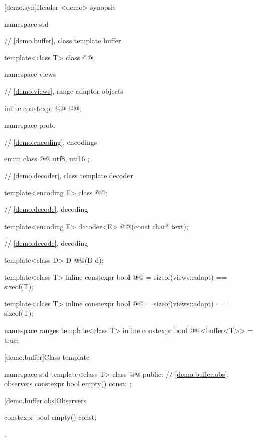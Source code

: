 [demo.syn]{Header <demo> synopsis}

\begin{codeblock}
namespace std {
  // \ref{demo.buffer}, class template buffer

  template<class T> class @@;

  namespace views {
    // \ref{demo.views}, range adaptor objects

    inline constexpr @@ @@;
  }

  namespace proto {
    // \ref{demo.encoding}, encodings

    enum class @@ { utf8, utf16 };

    // \ref{demo.decoder}, class template decoder

    template<encoding E> class @@;

    // \ref{demo.decode}, decoding

    template<encoding E> decoder<E> @@(const char* text);
  }

  // \ref{demo.decode}, decoding

  template<class D> D @@(D d);

  template<class T> inline constexpr bool @@ = sizeof(views::adapt) == sizeof(T);

  template<class T>
  inline constexpr bool @@ = sizeof(views::adapt) == sizeof(T);

  namespace ranges {
    template<class T> inline constexpr bool @@<buffer<T>> = true;
  }
}
\end{codeblock}

[demo.buffer]{Class template }

\begin{codeblock}
namespace std {
  template<class T>
  class @@ {
  public:
    // \ref{demo.buffer.obs}, observers
    constexpr bool empty() const;
  };
}
\end{codeblock}

[demo.buffer.obs]{Observers}

%
\begin{itemdecl}
constexpr bool empty() const;
\end{itemdecl}

\begin{itemdescr}
\pnum
\returns
{}.
\end{itemdescr}

